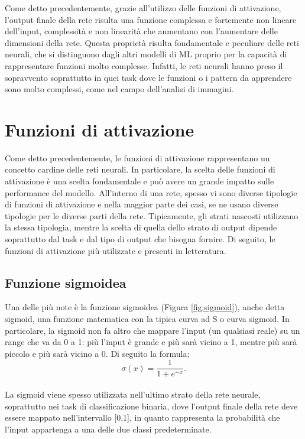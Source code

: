 Come detto precedentemente, grazie all’utilizzo delle funzioni di attivazione, l’output finale della rete risulta una funzione complessa e fortemente non lineare dell’input, complessità e non linearità che aumentano con l’aumentare delle dimensioni della rete. Questa proprietà risulta fondamentale e peculiare delle reti neurali, che si distinguono dagli altri modelli di ML proprio per la capacità di rappresentare funzioni molto complesse. Infatti, le reti neurali hanno preso il sopravvento soprattutto in quei task dove le funzioni o i pattern da apprendere sono molto complessi,  come nel campo dell’analisi di immagini.












\section{Funzioni di attivazione}
Come detto precedentemente, le funzioni di attivazione rappresentano un concetto cardine delle reti neurali. In particolare, la scelta delle funzioni di attivazione è una scelta fondamentale e può avere un grande impatto sulle performance del modello. All’interno di una rete, spesso vi sono diverse tipologie di funzioni di attivazione e nella maggior parte dei casi, se ne usano diverse tipologie per le diverse parti della rete. Tipicamente, gli strati nascosti utilizzano la stessa tipologia, mentre la scelta di quella dello strato di output dipende soprattutto dal task e dal tipo di output che bisogna fornire.
Di seguito, le funzioni di attivazione più utilizzate e presenti in letteratura.

\subsection{Funzione sigmoidea}
Una delle più note è la funzione sigmoidea (Figura \ref{fig:sigmoid}), anche detta sigmoid, una funzione matematica con la tipica curva ad S o curva sigmoid. In particolare, la sigmoid non fa altro che mappare l’input (un qualsiasi reale) su un range che va da 0 a 1: più l’input è grande e più sarà vicino a 1, mentre più sarà piccolo e più sarà vicino a 0. Di seguito la formula:
\\
\begin{equation}
\sigma(x) = \frac{1}{1+e^{-x}}.
\end{equation}
\\
La sigmoid viene spesso utilizzata nell’ultimo strato della rete neurale, soprattutto nei task di classificazione binaria, dove l’output finale della rete deve essere mappato nell’intervallo [0,1], in quanto rappresenta la probabilità che l’input appartenga a una delle due classi predeterminate.\\ \\

